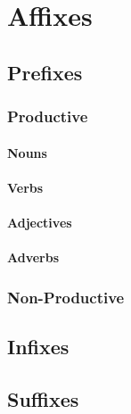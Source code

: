 \chapter{Affixes}

\section{Prefixes}
\subsection{Productive}
\subsubsection{Nouns}

















\subsubsection{Verbs}


\subsubsection{Adjectives}



\subsubsection{Adverbs}

\subsection{Non-Productive}




\section{Infixes}

\section{Suffixes}

